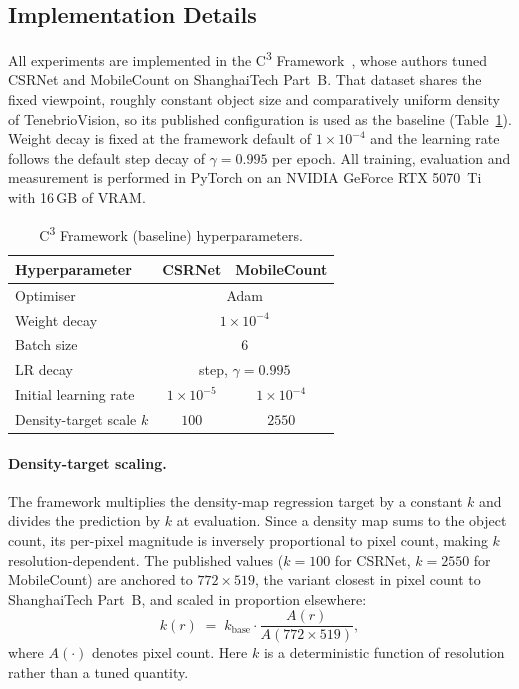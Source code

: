 \documentclass[conference]{IEEEtran}
\begin{document}
\subsection{Implementation Details}
\label{sec:impl_details}

All experiments are implemented in the C\textsuperscript{3}
Framework~\cite{gao2019c3}, whose authors tuned CSRNet and MobileCount on
ShanghaiTech Part~B. That dataset shares the fixed viewpoint, roughly constant
object size and comparatively uniform density of TenebrioVision, so its
published configuration is used as the baseline
(Table~\ref{tab:baseline_hyperparameters}). Weight decay is fixed at the
framework default of $1\times10^{-4}$ and the learning rate follows the default
step decay of $\gamma = 0.995$ per epoch. All training, evaluation and
measurement is performed in PyTorch on an NVIDIA GeForce RTX 5070~Ti with
16\,GB of VRAM.

\begin{table}[t]
    \centering
    \caption{C\textsuperscript{3} Framework (baseline) hyperparameters.}
    \label{tab:baseline_hyperparameters}
    \begin{tabular}{lcc}
        \toprule
        Hyperparameter          & CSRNet             & MobileCount \\
        \midrule
        Optimiser               & \multicolumn{2}{c}{Adam} \\
        Weight decay            & \multicolumn{2}{c}{$1\times10^{-4}$} \\
        Batch size              & \multicolumn{2}{c}{$6$} \\
        LR decay                & \multicolumn{2}{c}{step, $\gamma = 0.995$} \\
        Initial learning rate   & $1\times10^{-5}$   & $1\times10^{-4}$ \\
        Density-target scale $k$ & $100$             & $2550$ \\
        \bottomrule
    \end{tabular}
\end{table}

\paragraph{Density-target scaling.}
The framework multiplies the density-map regression target by a constant $k$ and
divides the prediction by $k$ at evaluation. Since a density map sums to the
object count, its per-pixel magnitude is inversely proportional to pixel count,
making $k$ resolution-dependent. The published values ($k = 100$ for CSRNet,
$k = 2550$ for MobileCount) are anchored to $772\times519$, the variant closest
in pixel count to ShanghaiTech Part~B, and scaled in proportion elsewhere:
\begin{equation}
    k(r) \;=\; k_{\mathrm{base}}\cdot \frac{A(r)}{A(772\times519)},
    \label{eq:logpara_scaling}
\end{equation}
where $A(\cdot)$ denotes pixel count. Here $k$ is a deterministic function of
resolution rather than a tuned quantity.
\end{document}

